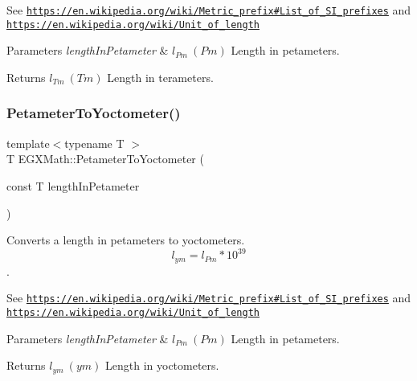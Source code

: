 See \href{https://en.wikipedia.org/wiki/Metric_prefix#List_of_SI_prefixes}{\tt https\+://en.\+wikipedia.\+org/wiki/\+Metric\+\_\+prefix\#\+List\+\_\+of\+\_\+\+S\+I\+\_\+prefixes} and \href{https://en.wikipedia.org/wiki/Unit_of_length}{\tt https\+://en.\+wikipedia.\+org/wiki/\+Unit\+\_\+of\+\_\+length} 
\begin{DoxyParams}{Parameters}
{\em length\+In\+Petameter} & $ l_{Pm}\ (Pm)$ Length in petameters. \\
\hline
\end{DoxyParams}
\begin{DoxyReturn}{Returns}
$ l_{Tm}\ (Tm)$ Length in terameters. 
\end{DoxyReturn}
\mbox{\label{group___e_g_x_math-_conversions-_length_conversions-_s_i-_petameter-_s_i_ga6fd2701bf757e5a6ca26a0d506471433}} 
\subsubsection{\texorpdfstring{Petameter\+To\+Yoctometer()}{PetameterToYoctometer()}}
{\footnotesize\ttfamily template$<$typename T $>$ \\
T E\+G\+X\+Math\+::\+Petameter\+To\+Yoctometer (\begin{DoxyParamCaption}\item[{const T}]{length\+In\+Petameter }\end{DoxyParamCaption})}



Converts a length in petameters to yoctometers. \[ l_{ym}=l_{Pm} * 10^{39} \]. 

See \href{https://en.wikipedia.org/wiki/Metric_prefix#List_of_SI_prefixes}{\tt https\+://en.\+wikipedia.\+org/wiki/\+Metric\+\_\+prefix\#\+List\+\_\+of\+\_\+\+S\+I\+\_\+prefixes} and \href{https://en.wikipedia.org/wiki/Unit_of_length}{\tt https\+://en.\+wikipedia.\+org/wiki/\+Unit\+\_\+of\+\_\+length} 
\begin{DoxyParams}{Parameters}
{\em length\+In\+Petameter} & $ l_{Pm}\ (Pm)$ Length in petameters. \\
\hline
\end{DoxyParams}
\begin{DoxyReturn}{Returns}
$ l_{ym}\ (ym)$ Length in yoctometers. 
\end{DoxyReturn}
\mbox{\label{group___e_g_x_math-_conversions-_length_conversions-_s_i-_petameter-_s_i_ga9ffc5119dfdd8427918e9f6cd6e4c2c8}} 
